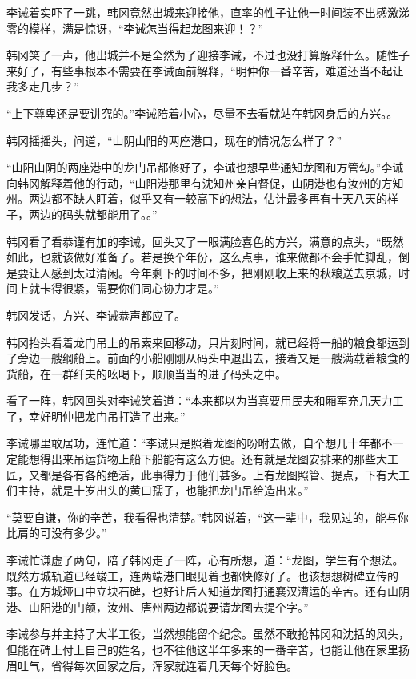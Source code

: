 李诫着实吓了一跳，韩冈竟然出城来迎接他，直率的性子让他一时间装不出感激涕零的模样，满是惊讶，“李诫怎当得起龙图来迎！？”

韩冈笑了一声，他出城并不是全然为了迎接李诫，不过也没打算解释什么。随性子来好了，有些事根本不需要在李诫面前解释，“明仲你一番辛苦，难道还当不起让我多走几步？”

“上下尊卑还是要讲究的。”李诫陪着小心，尽量不去看就站在韩冈身后的方兴。。

韩冈摇摇头，问道，“山阴山阳的两座港口，现在的情况怎么样了？”

“山阳山阴的两座港中的龙门吊都修好了，李诫也想早些通知龙图和方管勾。”李诫向韩冈解释着他的行动，“山阳港那里有沈知州亲自督促，山阴港也有汝州的方知州。两边都不缺人盯着，似乎又有一较高下的想法，估计最多再有十天八天的样子，两边的码头就都能用了。。”

韩冈看了看恭谨有加的李诫，回头又了一眼满脸喜色的方兴，满意的点头，“既然如此，也就该做好准备了。若是换个年份，这么点事，谁来做都不会手忙脚乱，倒是要让人感到太过清闲。今年剩下的时间不多，把刚刚收上来的秋粮送去京城，时间上就卡得很紧，需要你们同心协力才是。”

韩冈发话，方兴、李诫恭声都应了。

韩冈抬头看着龙门吊上的吊索来回移动，只片刻时间，就已经将一船的粮食都运到了旁边一艘纲船上。前面的小船刚刚从码头中退出去，接着又是一艘满载着粮食的货船，在一群纤夫的吆喝下，顺顺当当的进了码头之中。

看了一阵，韩冈回头对李诫笑着道：“本来都以为当真要用民夫和厢军充几天力工了，幸好明仲把龙门吊打造了出来。”

李诫哪里敢居功，连忙道：“李诫只是照着龙图的吩咐去做，自个想几十年都不一定能想得出来吊运货物上船下船能有这么方便。还有就是龙图安排来的那些大工匠，又都是各有各的绝活，此事得力于他们甚多。上有龙图照管、提点，下有大工们主持，就是十岁出头的黄口孺子，也能把龙门吊给造出来。”

“莫要自谦，你的辛苦，我看得也清楚。”韩冈说着，“这一辈中，我见过的，能与你比肩的可没有多少。”

李诫忙谦虚了两句，陪了韩冈走了一阵，心有所想，道：“龙图，学生有个想法。既然方城轨道已经竣工，连两端港口眼见着也都快修好了。也该想想树碑立传的事。在方城垭口中立块石碑，也好让后人知道龙图打通襄汉漕运的辛苦。还有山阴港、山阳港的门额，汝州、唐州两边都说要请龙图去提个字。”

李诫参与并主持了大半工役，当然想能留个纪念。虽然不敢抢韩冈和沈括的风头，但能在碑上付上自己的姓名，也不往他这半年多来的一番辛苦，也能让他在家里扬眉吐气，省得每次回家之后，浑家就连着几天每个好脸色。

